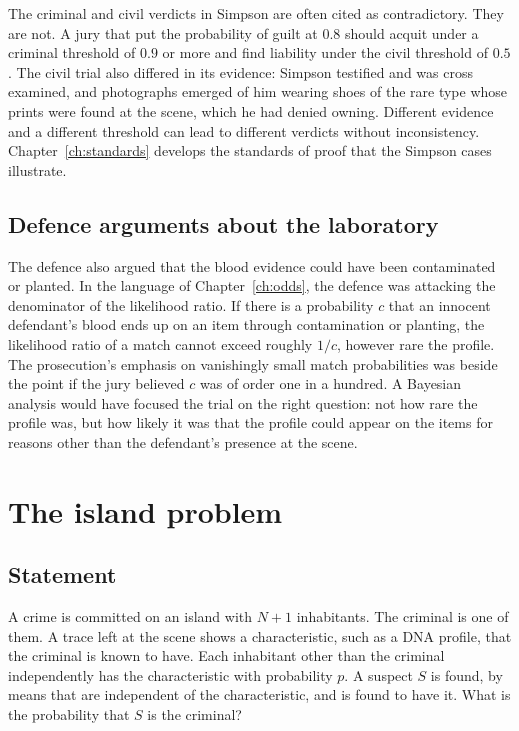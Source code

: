 The criminal and civil verdicts in Simpson are often cited as contradictory. They are not. A jury that put the probability of guilt at $0.8$ should acquit under a criminal threshold of $0.9$ or more and find liability under the civil threshold of $0.5$. The civil trial also differed in its evidence: Simpson testified and was cross examined, and photographs emerged of him wearing shoes of the rare type whose prints were found at the scene, which he had denied owning. Different evidence and a different threshold can lead to different verdicts without inconsistency. Chapter~\ref{ch:standards} develops the standards of proof that the Simpson cases illustrate.

\subsection{Defence arguments about the laboratory}

The defence also argued that the blood evidence could have been contaminated or planted. In the language of Chapter~\ref{ch:odds}, the defence was attacking the denominator of the likelihood ratio. If there is a probability $c$ that an innocent defendant's blood ends up on an item through contamination or planting, the likelihood ratio of a match cannot exceed roughly $1/c$, however rare the profile. The prosecution's emphasis on vanishingly small match probabilities was beside the point if the jury believed $c$ was of order one in a hundred. A Bayesian analysis would have focused the trial on the right question: not how rare the profile was, but how likely it was that the profile could appear on the items for reasons other than the defendant's presence at the scene.

\section{The island problem}

\subsection{Statement}

A crime is committed on an island with $N+1$ inhabitants. The criminal is one of them. A trace left at the scene shows a characteristic, such as a DNA profile, that the criminal is known to have. Each inhabitant other than the criminal independently has the characteristic with probability $p$. A suspect $S$ is found, by means that are independent of the characteristic, and is found to have it. What is the probability that $S$ is the criminal?

